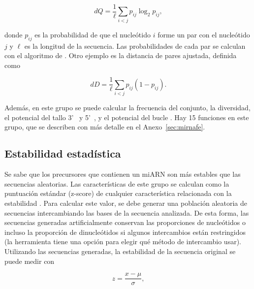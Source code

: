 \begin{equation}
	\label{eq:dQ}
	dQ = \frac{1}{\ell} \sum_{i<j} p_{ij} \log_2 p_{ij} ,
\end{equation}

\noindent donde $p_{ij}$ es la probabilidad de que el nucleótido $i$ forme un par con el nucleótido $j$ y $\ell$ es la longitud de la secuencia. Las
probabilidades de cada par se calculan con el algoritmo de \cite{mccaskill1990}. Otro ejemplo es la distancia de pares ajustada, definida como

\begin{equation}
	\label{eq:dD}
	dD = \frac{1}{\ell} \sum_{i<j} p_{ij} (1 - p_{ij}).
\end{equation}

Además, en este grupo se puede calcular la frecuencia del conjunto, la diversidad, el potencial del tallo 3\textquoteright~ y 5\textquoteright~, y el
potencial del bucle \citep{terai2007mirrim}. Hay 15 funciones en este grupo, que se describen con más detalle en el Anexo~\ref{sec:mirnafe}.

\subsection{Estabilidad estadística}

Se sabe que los precursores que contienen un miARN son más estables que las secuencias aleatorias. Las características de este grupo se calculan como la
puntuación estándar (z-score) de cualquier característica relacionada con la estabilidad \citep{bonnet2004evidence}. Para calcular este valor, se debe generar una
población aleatoria de secuencias intercambiando las bases de la secuencia analizada. De esta forma, las secuencias generadas artificialmente conservan las
proporciones de nucleótidos o incluso la proporción de dinucleótidos si algunos intercambios están restringidos (la herramienta tiene una opción para
elegir qué método de intercambio usar). Utilizando las secuencias generadas, la estabilidad de la secuencia original se puede medir con

\begin{equation}
	z = \frac{x-\mu}{\sigma},
\end{equation}

